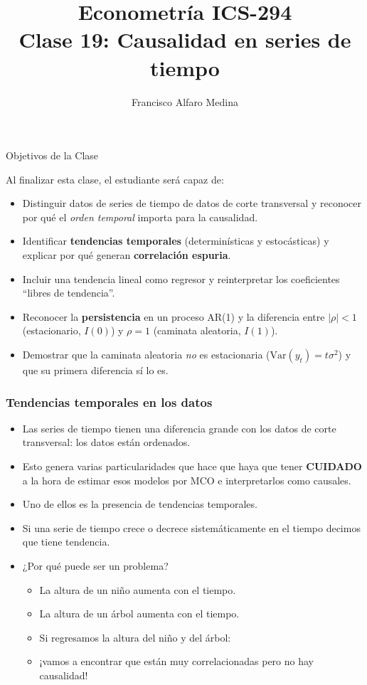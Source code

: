 \documentclass{beamer}
\title[ICS-294]{Econometría ICS-294\\ \small{Clase 19: Causalidad en series de tiempo}}
\author{Francisco Alfaro Medina}
\institute[USM]
{Universidad Técnica Federico Santa María\\ %
	\medskip
	\textit{francisco.alfaro@usm.cl} %

}
\date{}
\begin{document}
\begin{frame}
	\titlepage %


\end{frame}
\logo{}

\begin{frame}{Objetivos de la Clase}

Al finalizar esta clase, el estudiante será capaz de:

\begin{itemize}
    \item[\checkmark] Distinguir datos de series de tiempo de datos de corte transversal y reconocer por qué el \emph{orden temporal} importa para la causalidad.
    \item[\checkmark] Identificar \textbf{tendencias temporales} (determinísticas y estocásticas) y explicar por qué generan \textbf{correlación espuria}.
    \item[\checkmark] Incluir una tendencia lineal como regresor y reinterpretar los coeficientes ``libres de tendencia''.
    \item[\checkmark] Reconocer la \textbf{persistencia} en un proceso AR(1) y la diferencia entre $|\rho|<1$ (estacionario, $I(0)$) y $\rho=1$ (caminata aleatoria, $I(1)$).
    \item[\checkmark] Demostrar que la caminata aleatoria \emph{no} es estacionaria ($\text{Var}(y_t)=t\sigma^2$) y que su primera diferencia sí lo es.
\end{itemize}

\end{frame}

\begin{frame}[shrink=10]
\frametitle{Tendencias temporales en los datos}

\begin{itemize}
  \item Las series de tiempo tienen una diferencia grande con los datos de corte transversal: los datos están ordenados.
  \item Esto genera varias particularidades que hace que haya que tener \textbf{CUIDADO} a la hora de estimar esos modelos por MCO e interpretarlos como causales.
  \item Uno de ellos es la presencia de tendencias temporales.
  \item Si una serie de tiempo crece o decrece sistemáticamente en el tiempo decimos que tiene tendencia.
  \item ¿Por qué puede ser un problema?
  \begin{itemize}
    \item La altura de un niño aumenta con el tiempo.
    \item La altura de un árbol aumenta con el tiempo.
    \item Si regresamos la altura del niño y del árbol:
    \item ¡vamos a encontrar que están muy correlacionadas pero no hay causalidad!
  \end{itemize}
\end{itemize}

\end{frame}
\end{document}
